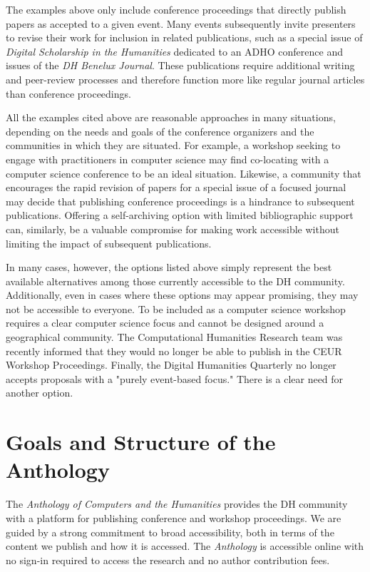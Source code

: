 \documentclass[final]{anthology-ch} %
\begin{document}
The examples above only include conference proceedings that directly
publish papers as accepted to a given event. Many events subsequently
invite presenters to revise their work for inclusion in related
publications, such as a special issue of \emph{Digital Scholarship in
the Humanities} dedicated to an ADHO conference and issues of the
\emph{DH Benelux Journal}. These publications require additional writing
and peer-review processes and therefore function more like regular
journal articles than conference proceedings.

All the examples cited above are reasonable approaches in many
situations, depending on the needs and goals of the conference
organizers and the communities in which they are situated. For example,
a workshop seeking to engage with practitioners in computer science may
find co-locating with a computer science conference to be an ideal
situation. Likewise, a community that encourages the rapid revision of
papers for a special issue of a focused journal may decide that
publishing conference proceedings is a hindrance to subsequent
publications. Offering a self-archiving option with limited
bibliographic support can, similarly, be a valuable compromise for
making work accessible without limiting the impact of subsequent
publications.

In many cases, however, the options listed above simply represent the
best available alternatives among those currently accessible to the DH
community. Additionally, even in cases where these options may appear
promising, they may not be accessible to everyone. To be included as a
computer science workshop requires a clear computer science focus and
cannot be designed around a geographical community. The Computational
Humanities Research team was recently informed that they would no longer
be able to publish in the CEUR Workshop Proceedings. Finally, the
Digital Humanities Quarterly no longer accepts proposals with a "purely
event-based focus." There is a clear need for another option.

\section{Goals and Structure of the Anthology}

The \emph{Anthology of Computers and the Humanities} provides the DH
community with a platform for publishing conference and workshop
proceedings. We are guided by a strong commitment to broad
accessibility, both in terms of the content we publish and how it is
accessed. The \emph{Anthology} is accessible online with no sign-in
required to access the research and no author contribution fees.
\end{document}
